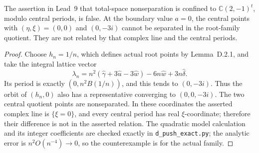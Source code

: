 \begin{proposition}\label{push:src:D.2.2}
The assertion in Lead~9 that total-space nonseparation is confined to
\(\mathbb C(2,-1)^t\), modulo central periods, is false. At the
boundary value \(a=0\), the central points with \((\eta,\xi)=(0,0)\)
and \((0,-3i)\) cannot be separated in the root-family quotient.
They are not related by that complex line and the central periods.
\end{proposition}
\begin{proof}
Choose \(h_n=1/n\), which defines actual root points by Lemma~D.2.1,
and take the integral lattice vector
\[
 \lambda_n=n^2(\widehat\gamma+3\widehat u-3\widehat w)
            -6n\widehat w+3n\widehat\delta.
\]
Its period is exactly \((0,n^2B(1/n))\), and this tends to
\((0,-3i)\). Thus the orbit of \((h_n,0)\) also has a representative
converging to \((0,0,-3i)\). The two central quotient points are
nonseparated. In these coordinates the asserted complex line is
\(\{\xi=0\}\), and every central period has real \(\xi\)-coordinate;
therefore their difference is not in the asserted relation. The
quadratic model calculation and its integer coefficients are checked
exactly in \texttt{d\_push\_exact.py}; the analytic error is
\(n^2O(n^{-4})\to0\), so the counterexample is for the actual family.
\end{proof}

